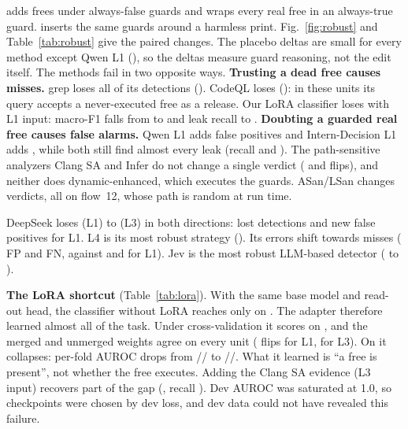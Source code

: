\Dead{} adds frees under always-false guards and wraps every real free in an always-true guard.
\Plac{} inserts the same guards around a harmless print.
Fig.~\ref{fig:robust} and Table~\ref{tab:robust} give the paired changes.
The placebo deltas are small for every method except Qwen L1 (),
so the \Dead{} deltas measure guard reasoning, not the edit itself.
The methods fail in two opposite ways.
\textbf{Trusting a dead free causes misses.}
grep loses all  of its detections ().
CodeQL loses  (): in these units its query accepts a never-executed free as a release.
Our LoRA classifier loses  with L1 input:
macro-F1 falls from  to  and leak recall to .
\textbf{Doubting a guarded real free causes false alarms.}
Qwen L1 adds  false positives and Intern-Decision L1 adds ,
while both still find almost every leak (recall  and ).
The path-sensitive analyzers Clang SA and Infer do not change a single verdict ( and  flips),
and neither does dynamic-enhanced, which executes the guards.
ASan/LSan changes  verdicts, all on flow~12, whose path is random at run time.

DeepSeek loses  (L1) to  (L3) in both directions:
 lost detections and  new false positives for L1.
L4 is its most robust strategy ().
Its errors shift towards misses ( FP and  FN, against  and  for L1).
Jev is the most robust LLM-based detector ( to ).



\textbf{The LoRA shortcut} (Table~\ref{tab:lora}).
With the same base model and read-out head, the classifier without LoRA reaches only  on \Deb.
The adapter therefore learned almost all of the task.
Under cross-validation it scores  on \Deb, and the merged and unmerged weights agree on every unit
( flips for L1,  for L3).
On \Dead{} it collapses: per-fold AUROC drops from
//
to //.
What it learned is ``a free is present'', not whether the free executes.
Adding the Clang SA evidence (L3 input) recovers part of the gap (, recall ).
Dev AUROC was saturated at 1.0, so checkpoints were chosen by dev loss, and dev data could not have revealed this failure.

